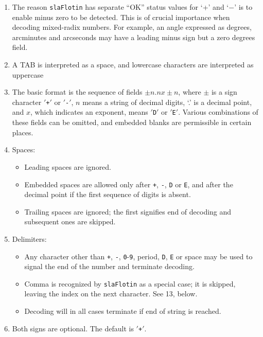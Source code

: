 \documentclass[11pt,fleqn,twoside]{article}
\renewcommand{\_}{{\tt\char'137}}     %
\newcommand{\fstring}[1]{\hspace{0.05em}\mbox{$'${\tt#1}\hspace{0.09em}$'$}}
\begin{document}
{
 \begin{enumerate}
 \item The reason {\tt slaFlotin} has separate ``OK'' status values
       for `+' and `$-$'
       is to enable minus zero to be detected.
       This is of crucial importance
       when decoding mixed-radix numbers.  For example, an angle
       expressed as degrees, arcminutes and arcseconds may have a
       leading minus sign but a zero degrees field.
 \item A TAB is interpreted as a space, and lowercase characters are
       interpreted as uppercase
 \item The basic format is the sequence of fields $\pm n.n x \pm n$,
       where $\pm$ is a sign
       character \fstring{+} or \fstring{-},
       $n$ means a string of decimal digits,
       `.' is a decimal point, and $x$, which indicates an exponent,
       means \fstring{D} or \fstring{E}.
       Various combinations of these fields can be
       omitted, and embedded blanks are permissible in certain places.
 \item Spaces:
       \begin{itemize}
       \item Leading spaces are ignored.
       \item Embedded spaces are allowed only after
             {\tt +},
             {\tt -},
             {\tt D} or
             {\tt E},
             and after the decimal point if the first sequence of
             digits is absent.
       \item Trailing spaces are ignored;  the first signifies
             end of decoding and subsequent ones are skipped.
       \end{itemize}
 \item Delimiters:
       \begin{itemize}
       \item Any character other than
             {\tt +},
             {\tt -},
             {\tt 0}-{\tt 9},
             period,
             {\tt D},
             {\tt E} or space may be
             used to signal the end of the number and terminate decoding.
       \item Comma is recognized by {\tt slaFlotin} as a special case; it
             is skipped, leaving the index on the next character.  See
             13, below.
       \item Decoding will in all cases terminate if end of string
             is reached.
       \end{itemize}
 \item Both signs are optional.  The default is \fstring{+}.

\end{enumerate}}
\end{document}

